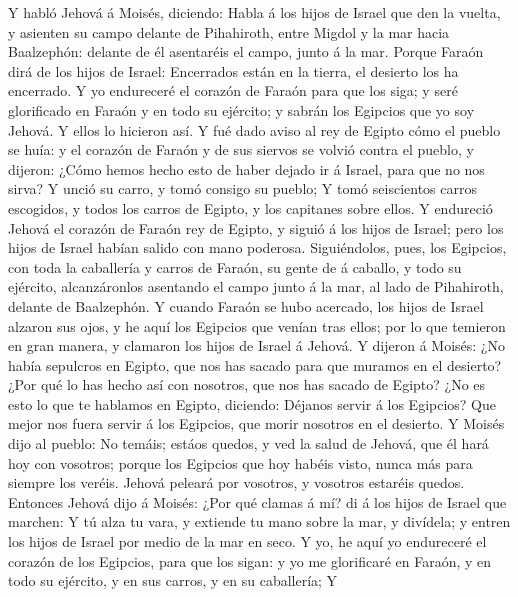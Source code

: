  Y habló Jehová á Moisés, diciendo:  Habla á
los hijos de Israel que den la vuelta, y asienten su campo delante de
Pihahiroth, entre Migdol y la mar hacia Baalzephón: delante de él
asentaréis el campo, junto á la mar.  Porque Faraón dirá
de los hijos de Israel: Encerrados están en la tierra, el desierto los
ha encerrado.  Y yo endureceré el corazón de Faraón para
que los siga; y seré glorificado en Faraón y en todo su ejército; y
sabrán los Egipcios que yo soy Jehová. Y ellos lo hicieron así.
 Y fué dado aviso al rey de Egipto cómo el pueblo se huía:
y el corazón de Faraón y de sus siervos se volvió contra el pueblo, y
dijeron: ¿Cómo hemos hecho esto de haber dejado ir á Israel, para que no
nos sirva?  Y unció su carro, y tomó consigo su pueblo;
 Y tomó seiscientos carros escogidos, y todos los carros
de Egipto, y los capitanes sobre ellos.  Y endureció
Jehová el corazón de Faraón rey de Egipto, y siguió á los hijos de
Israel; pero los hijos de Israel habían salido con mano poderosa.
 Siguiéndolos, pues, los Egipcios, con toda la caballería
y carros de Faraón, su gente de á caballo, y todo su ejército,
alcanzáronlos asentando el campo junto á la mar, al lado de Pihahiroth,
delante de Baalzephón.  Y cuando Faraón se hubo acercado,
los hijos de Israel alzaron sus ojos, y he aquí los Egipcios que venían
tras ellos; por lo que temieron en gran manera, y clamaron los hijos de
Israel á Jehová.  Y dijeron á Moisés: ¿No había sepulcros
en Egipto, que nos has sacado para que muramos en el desierto? ¿Por qué
lo has hecho así con nosotros, que nos has sacado de Egipto?
 ¿No es esto lo que te hablamos en Egipto, diciendo:
Déjanos servir á los Egipcios? Que mejor nos fuera servir á los
Egipcios, que morir nosotros en el desierto.  Y Moisés
dijo al pueblo: No temáis; estáos quedos, y ved la salud de Jehová, que
él hará hoy con vosotros; porque los Egipcios que hoy habéis visto,
nunca más para siempre los veréis.  Jehová peleará por
vosotros, y vosotros estaréis quedos.  Entonces Jehová
dijo á Moisés: ¿Por qué clamas á mí? di á los hijos de Israel que
marchen:  Y tú alza tu vara, y extiende tu mano sobre la
mar, y divídela; y entren los hijos de Israel por medio de la mar en
seco.  Y yo, he aquí yo endureceré el corazón de los
Egipcios, para que los sigan: y yo me glorificaré en Faraón, y en todo
su ejército, y en sus carros, y en su caballería;  Y
